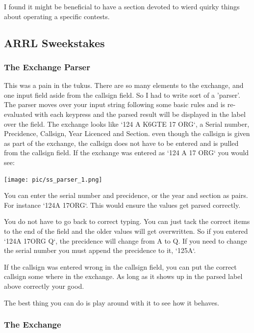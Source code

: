 \documentclass{article}
\begin{document}
I found it might be beneficial to have a section devoted to wierd quirky things about operating a specific contests.

\subsection{ARRL Sweekstakes}

\subsubsection{The Exchange Parser}

This was a pain in the tukus. There are so many elements to the exchange, and one input field aside from the callsign field. So I had to write sort of a 'parser'. The parser moves over your input string following some basic rules and is re-evaluated with each keypress and the parsed result will be displayed in the label over the field. The exchange looks like `124 A K6GTE 17 ORG`, a Serial number, Precidence, Callsign, Year Licenced and Section. even though the callsign is given as part of the exchange, the callsign does not have to be entered and is pulled from the callsign field. If the exchange was entered as `124 A 17 ORG` you would see:

\vspace{0.5cm}
\texttt{[image: pic/ss\_parser\_1.png]}
\vspace{0.5cm}

You can enter the serial number and precidence, or the year and section as pairs. For instance `124A 17ORG`. This would ensure the values get parsed correctly.

You do not have to go back to correct typing. You can just tack the correct items to the end of the field and the older values will get overwritten. So if you entered `124A 17ORG Q`, the precidence will change from A to Q. If you need to change the serial number you must append the precidence to it, `125A`.

If the callsign was entered wrong in the callsign field, you can put the correct callsign some where in the exchange. As long as it shows up in the parsed label above correctly your good.

The best thing you can do is play around with it to see how it behaves.

\subsubsection{The Exchange}
\end{document}
